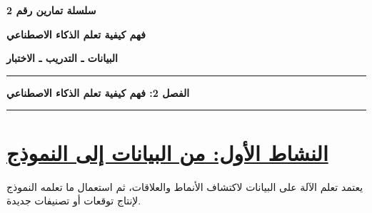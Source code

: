 \documentclass[a4paper]{article}
\begin{document}

\begin{center}

{\Large\khatt\textbf{سلسلة تمارين رقم 2}}

\vspace{0.15cm}

{\Large\khatt\textbf{فهم كيفية تعلم الذكاء الاصطناعي}}

\vspace{0.1cm}

{\khatt\textbf{البيانات ـ التدريب ـ الاختبار}}

\end{center}

\rule{\textwidth}{1pt}

\begin{center}
{\khatt\textbf{الفصل 2: فهم كيفية تعلم الذكاء الاصطناعي}}
\end{center}

\rule{\textwidth}{1pt}


\section*{\khatt\underline{النشاط الأول: من البيانات إلى النموذج}}

يعتمد تعلم الآلة على البيانات لاكتشاف الأنماط والعلاقات،
ثم استعمال ما تعلمه النموذج لإنتاج توقعات أو تصنيفات جديدة.
\end{document}
